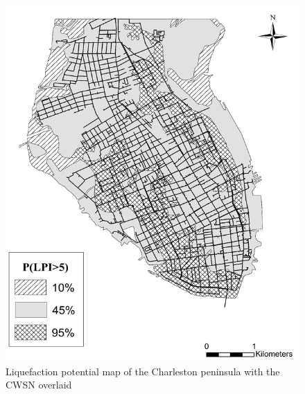     \begin{figure}[H]
        \centering
        \includegraphics[scale=0.5]{Figures/Images/Reliability Analysis of Water Supply Network/CWSN_LPI.png}
        \caption{Liquefaction potential map of the Charleston peninsula with the CWSN overlaid}
        \label{fig:CWSN_LPI}
    \end{figure}